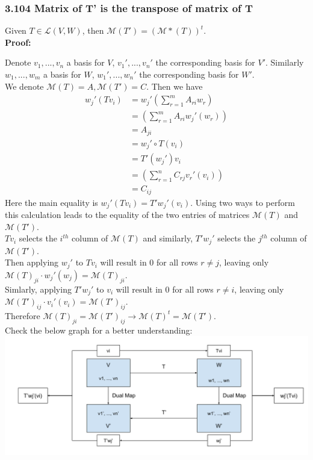 \documentclass{article}
\begin{document}
\subsubsection*{3.104 Matrix of T' is the transpose of matrix of T}
Given $T \in \mathcal{L}(V, W)$, then $\mathcal{M}(T') = (\mathcal{M}*(T))^t$.\\
\textbf{Proof:}
\begin{addmargin}[1em]{0em}
    Denote $v_1, ..., v_n$ a basis for $V$, $v_1', ..., v_n'$ the corresponding basis for $V'$. Similarly $w_1, ..., w_m$ a basis for $W$, $w_1', ..., w_n'$ the corresponding basis for $W'$.\\
    We denote $\mathcal{M}(T) = A, \mathcal{M}(T') = C$. Then we have
    \begin{equation*}
        \begin{split}
            w_j'(Tv_i) &= w_j'\left(
                \sum_{r=1}^{m} A_{ri} w_r
            \right)\\
            &= \left(
                \sum_{r=1}^{m} A_{ri} w_j'(w_r)
            \right)\\
            &= A_{ji}\\
            &= w_j' \circ T(v_i)\\
            &= T'(w_j')v_i\\
            &= \left(
                \sum_{r=1}^{n} C_{rj}v_r'(v_i)
            \right)\\
            &= C_{ij}
        \end{split}
    \end{equation*}
    Here the main equality is $w_j'(Tv_i) = T'w_j'(v_i)$. Using two ways to perform this calculation leads to the equality of the two entries of matrices $\mathcal{M}(T)$ and $\mathcal{M}(T')$.\\
    $Tv_i$ selects the $i^{th}$ column of $\mathcal{M}(T)$ and similarly, $T'w_j'$ selects the $j^{th}$ column of $\mathcal{M}(T')$.\\
    Then applying $w_j'$ to $Tv_i$ will result in $0$ for all rows $r \neq j$, leaving only $\mathcal{M}(T)_{ji} \cdot w_j'(w_j) = \mathcal{M}(T)_{ji}$.\\
    Simlarly, applying $T'w_j'$ to $v_i$ will result in $0$ for all rows $r \neq i$, leaving only $\mathcal{M}(T')_{ij} \cdot v_i'(v_i)= \mathcal{M}(T')_{ij}$.\\
    Therefore $\mathcal{M}(T)_{ji} = \mathcal{M}(T')_{ij} \rightarrow \mathcal{M}(T)^t = \mathcal{M}(T')$.\\
    Check the below graph for a better understanding:\\
    \includegraphics*[scale=0.40]{dual_map_matrix.png}
\end{addmargin}
\end{document}
